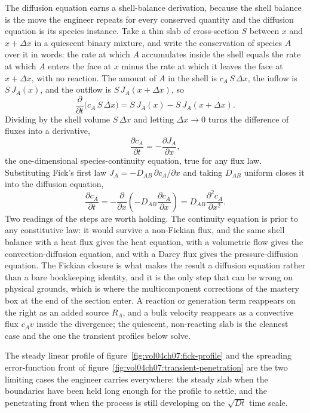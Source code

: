 The diffusion equation earns a shell-balance derivation, because the
shell balance is the move the engineer repeats for every conserved
quantity and the diffusion equation is its species instance. Take a thin
slab of cross-section $S$ between $x$ and $x + \Delta x$ in a quiescent
binary mixture, and write the conservation of species $A$ over it in
words: the rate at which $A$ accumulates inside the shell equals the rate
at which $A$ enters the face at $x$ minus the rate at which it leaves the
face at $x + \Delta x$, with no reaction. The amount of $A$ in the shell
is $c_A\,S\,\Delta x$, the inflow is $S\,J_A(x)$, and the outflow is
$S\,J_A(x + \Delta x)$, so
\[
\frac{\partial}{\partial t}\big(c_A\,S\,\Delta x\big) =
S\,J_A(x) - S\,J_A(x + \Delta x).
\]
Dividing by the shell volume $S\,\Delta x$ and letting $\Delta x \to 0$
turns the difference of fluxes into a derivative,
\[
\frac{\partial c_A}{\partial t} = -\frac{\partial J_A}{\partial x},
\]
the one-dimensional species-continuity equation, true for any flux law.
Substituting Fick's first law $J_A = -D_{AB}\,\partial c_A/\partial x$
and taking $D_{AB}$ uniform closes it into the diffusion equation,
\[
\frac{\partial c_A}{\partial t} = -\frac{\partial}{\partial x}
\!\left(-D_{AB}\frac{\partial c_A}{\partial x}\right) =
D_{AB}\frac{\partial^2 c_A}{\partial x^2}.
\]
Two readings of the steps are worth holding. The continuity equation is
prior to any constitutive law: it would survive a non-Fickian flux, and
the same shell balance with a heat flux gives the heat equation, with a
volumetric flow gives the convection-diffusion equation, and with a
Darcy flux gives the pressure-diffusion equation. The Fickian closure is
what makes the result a diffusion equation rather than a bare bookkeeping
identity, and it is the only step that can be wrong on physical grounds,
which is where the multicomponent corrections of the mastery box at the
end of the section enter. A reaction or generation term reappears on the
right as an added source $R_A$, and a bulk velocity reappears as a
convective flux $c_A v$ inside the divergence; the quiescent,
non-reacting slab is the cleanest case and the one the transient profiles
below solve.





The steady linear profile of figure~\ref{fig:vol04ch07:fick-profile}
and the spreading error-function front of
figure~\ref{fig:vol04ch07:transient-penetration} are the two
limiting cases the engineer carries everywhere: the steady slab when
the boundaries have been held long enough for the profile to settle,
and the penetrating front when the process is still developing on the
$\sqrt{Dt}$ time scale.

